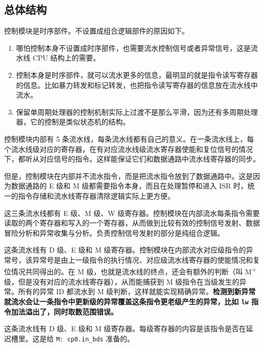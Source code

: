 \documentclass[12pt,AutoFakeBold,AutoFakeSlant]{article}
\providecommand{\tightlist}{%
  \setlength{\itemsep}{0pt}\setlength{\parskip}{0pt}}
\newcommand{\ms}[1]{\texttt{#1}}
\begin{document}
\hypertarget{ux603bux4f53ux7ed3ux6784}{%
\subsection{总体结构}\label{ux603bux4f53ux7ed3ux6784}}

控制模块是时序部件。不设置成组合逻辑部件的原因如下。

\begin{enumerate}
\def\labelenumi{\arabic{enumi}.}
\tightlist
\item
  哪怕控制本身不设置成时序部件，也需要流水控制信号或者异常信号，这是流水线 CPU 结构上的需要。
\item
  控制本身是时序部件，就可以流水更多的信息，最明显的就是指令读写寄存器的信息。比如暴力转发和标记转发，也把指令读写寄存器的信息放在流水线中流水。
\item
  保留单周期处理器的控制机制实际上过渡不是那么平滑，因为还有多周期处理器，它的控制是类似状态机的结构。
\end{enumerate}

控制模块内部有 5 条流水线，每条流水线都有自己的意义。在一条流水线上，每个流水线级对应的寄存器，在有对应流水线级流水寄存器使能和复位信号的情况下，都听从对应信号的指令。这样能保证它们和数据通路中流水线寄存器的同步。

但是，控制模块在内部并不流水指令，而是把流水指令放到了数据通路中。这是因为数据通路的 E 级和 M 级都需要指令本身，而且在处理暂停和进入 ISR 时，统一的指令存储和流水线寄存器清除逻辑实际上更方便。

\begin{description}
\tightlist
\item[记录寄存器读取和写入情况的 3 条流水线]
这三条流水线都有 E 级、M 级、W 级寄存器。控制模块在内部流水每条指令需要读取的两个寄存器和写入的一个寄存器，从而做到比较有效的控制信号发射、数据冒险分析和异常收集与分析。负责控制信号发射的部分是纯组合逻辑。
\item[异常 ID 流水线]
这条流水线有 D 级、E 级和 M 级寄存器。控制模块在内部流水对应级指令的异常号，该异常号是由上一级指令的执行情况、对应级流水线寄存器的使能情况和复位情况共同得出的。在 M 级，也就是流水线的终点，还会有额外的判断（叫 M\textsuperscript{+} 级，但是没有对应的流水线寄存器），从而能捕获到 M 级指令在当级发生的异常。所有的异常 ID 都流水到 M 级判断，这样就能实现精确异常。\textbf{检测到新异常就流水会让一条指令中更新级的异常覆盖这条指令更老级产生的异常，比如 \texttt{lw} 指令加法溢出了，同时取数范围错误。}
\item[指令是否在延迟槽里的流水线] 这条流水线有 D 级、E 级和 M 级寄存器。每级寄存器的内容是该指令是否在延迟槽里。这是给 \ms{M: cp0.in\_bds} 准备的。
\end{description}
\end{document}
